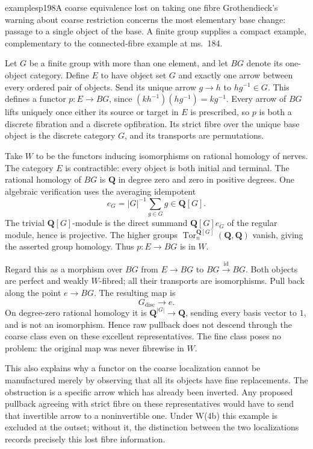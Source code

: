 \begin{dcomment}{examples}{p198}{A coarse equivalence lost on taking one fibre}
Grothendieck's warning about coarse restriction concerns the most elementary base change: passage to a single object of the base. A finite group supplies a compact example, complementary to the connected-fibre example at ms.~184.

Let $G$ be a finite group with more than one element, and let $BG$ denote its one-object category. Define $E$ to have object set $G$ and exactly one arrow between every ordered pair of objects. Send its unique arrow $g\to h$ to $hg^{-1}\in G$. This defines a functor $p:E\to BG$, since $(kh^{-1})(hg^{-1})=kg^{-1}$. Every arrow of $BG$ lifts uniquely once either its source or target in $E$ is prescribed, so $p$ is both a discrete fibration and a discrete opfibration. Its strict fibre over the unique base object is the discrete category $G$, and its transports are permutations.

Take $W$ to be the functors inducing isomorphisms on rational homology of nerves. The category $E$ is contractible: every object is both initial and terminal. The rational homology of $BG$ is $\mathbf Q$ in degree zero and zero in positive degrees. One algebraic verification uses the averaging idempotent
\[
e_G=|G|^{-1}\sum_{g\in G}g\in\mathbf Q[G].
\]
The trivial $\mathbf Q[G]$-module is the direct summand $\mathbf Q[G]e_G$ of the regular module, hence is projective. The higher groups $\operatorname{Tor}^{\mathbf Q[G]}_n(\mathbf Q,\mathbf Q)$ vanish, giving the asserted group homology. Thus $p:E\to BG$ is in $W$.

Regard this as a morphism over $BG$ from $E\to BG$ to $BG\xrightarrow{\mathrm{id}}BG$. Both objects are perfect and weakly $W$-fibred; all their transports are isomorphisms. Pull back along the point $e\to BG$. The resulting map is
\[
G_{\mathrm{disc}}\longrightarrow e.
\]
On degree-zero rational homology it is $\mathbf Q^{|G|}\to\mathbf Q$, sending every basis vector to $1$, and is not an isomorphism. Hence raw pullback does not descend through the coarse class even on these excellent representatives. The fine class poses no problem: the original map was never fibrewise in $W$.

This also explains why a functor on the coarse localization cannot be manufactured merely by observing that all its objects have fine replacements. The obstruction is a specific arrow which has already been inverted. Any proposed pullback agreeing with strict fibre on these representatives would have to send that invertible arrow to a noninvertible one. Under W(4b) this example is excluded at the outset; without it, the distinction between the two localizations records precisely this lost fibre information.
\end{dcomment}

